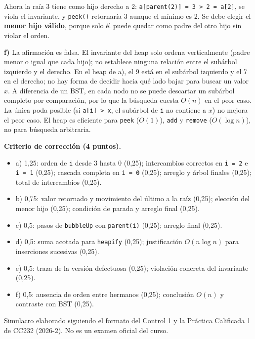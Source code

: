 \documentclass[11pt,a4paper]{article}
\begin{document}
Ahora la raíz 3 tiene como hijo derecho a 2: \texttt{a[parent(2)] = 3 > 2 = a[2]}, se viola el invariante, y \texttt{peek()} retornaría 3 aunque el mínimo es 2. Se debe elegir el \textbf{menor hijo válido}, porque solo él puede quedar como padre del otro hijo sin violar el orden.

\textbf{f)} La afirmación es falsa. El invariante del heap solo ordena verticalmente (padre menor o igual que cada hijo); no establece ninguna relación entre el subárbol izquierdo y el derecho. En el heap de a), el 9 está en el subárbol izquierdo y el 7 en el derecho; no hay forma de decidir hacia qué lado bajar para buscar un valor $x$. A diferencia de un BST, en cada nodo no se puede descartar un subárbol completo por comparación, por lo que la búsqueda cuesta $O(n)$ en el peor caso. La única poda posible (si \texttt{a[i] > x}, el subárbol de \texttt{i} no contiene a $x$) no mejora el peor caso. El heap es eficiente para \texttt{peek} ($O(1)$), \texttt{add} y \texttt{remove} ($O(\log n)$), no para búsqueda arbitraria.

\textbf{Criterio de corrección (4 puntos).}
\begin{itemize}[itemsep=0pt]
\item a) 1,25: orden de \texttt{i} desde 3 hasta 0 (0,25); intercambios correctos en \texttt{i = 2} e \texttt{i = 1} (0,25); cascada completa en \texttt{i = 0} (0,25); arreglo y árbol finales (0,25); total de intercambios (0,25).
\item b) 0,75: valor retornado y movimiento del último a la raíz (0,25); elección del menor hijo (0,25); condición de parada y arreglo final (0,25).
\item c) 0,5: pasos de \texttt{bubbleUp} con \texttt{parent(i)} (0,25); arreglo final (0,25).
\item d) 0,5: suma acotada para \texttt{heapify} (0,25); justificación $O(n \log n)$ para inserciones sucesivas (0,25).
\item e) 0,5: traza de la versión defectuosa (0,25); violación concreta del invariante (0,25).
\item f) 0,5: ausencia de orden entre hermanos (0,25); conclusión $O(n)$ y contraste con BST (0,25).
\end{itemize}

\vfill
\begin{center}
\small Simulacro elaborado siguiendo el formato del Control 1 y la Práctica Calificada 1 de CC232 (2026-2). No es un examen oficial del curso.
\end{center}
\end{document}
